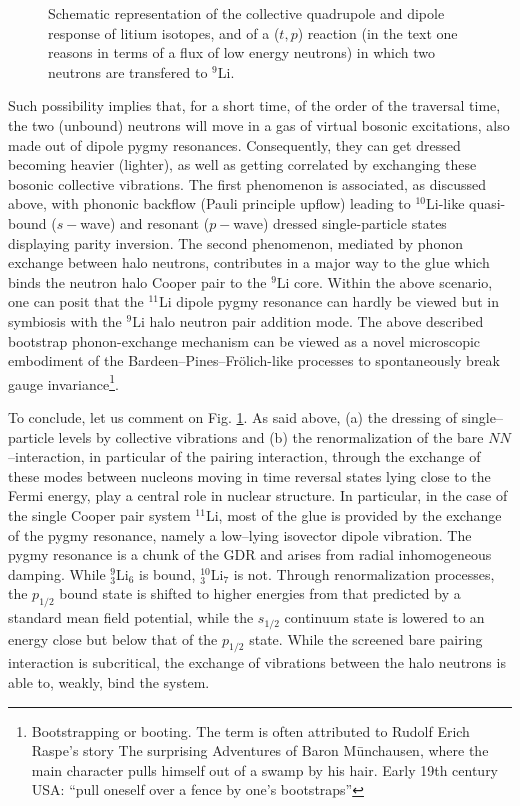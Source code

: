 \begin{subappendices}
\begin{figure}[h!]
\begin{center}
	\end{center}
	\caption{Schematic representation of the collective quadrupole and dipole response of litium isotopes, and of a ($t,p$) reaction (in the text one reasons in terms of a flux of low energy neutrons) in which two neutrons are transfered to $^9$Li.}
\label{fig8_A_1}
\end{figure}
Such possibility implies that, for a short time, of the order of the traversal time, the two (unbound) neutrons will move in a gas of virtual bosonic excitations, also made out of dipole pygmy resonances. Consequently, they can get dressed becoming heavier (lighter), as well as getting correlated by exchanging  these bosonic collective vibrations. 
The first phenomenon is associated, as discussed above, with phononic backflow (Pauli principle upflow) leading to $^{10}$Li-like quasi-bound ($s-$wave) and resonant ($p-$wave) dressed single-particle states displaying parity inversion.
The second phenomenon, mediated by phonon exchange between halo neutrons, contributes in a major way to the glue which binds the neutron halo Cooper pair to the $^{9}$Li core. Within the above scenario, one can posit that the $^{11}$Li dipole pygmy resonance can hardly be viewed but in symbiosis with the $^9$Li halo neutron pair addition mode. The above described bootstrap phonon-exchange mechanism can be viewed as a novel microscopic embodiment of the Bardeen--Pines--Fr\"{o}lich-like processes to spontaneously break gauge invariance\footnote{Bootstrapping or booting. The term is often attributed to Rudolf Erich Raspe's story The surprising Adventures of Baron M\=unchausen, where the main character pulls himself out of a swamp by his hair. Early 19th century USA: ``pull oneself over a fence by one's bootstraps''}.


To conclude, let us comment on Fig. \ref{fig8_A_1}. As said above, (a) the dressing of single--particle levels by collective vibrations and (b) the renormalization of the bare $NN$--interaction, in particular of the pairing interaction, through the exchange of these modes between nucleons moving in time reversal states lying close to the Fermi energy, play a central role in nuclear structure. In particular, in the case of the single Cooper pair system $^{11}$Li, most of the glue is provided by the exchange of the pygmy resonance, namely a low--lying isovector dipole vibration. The pygmy resonance is a chunk of the GDR  and arises from radial inhomogeneous damping.  While $^9_3$Li$_6$ is bound, $^{10}_3$Li$_7$ is not. Through renormalization processes, the $p_{1/2}$ bound state is shifted to higher energies from that predicted by a standard mean field potential, while the $s_{1/2}$ continuum state is lowered to an energy close but  below that of the $p_{1/2}$ state.  While the screened bare pairing interaction is subcritical, the exchange of vibrations between the halo neutrons is able to, weakly, bind the system.







\end{subappendices}
